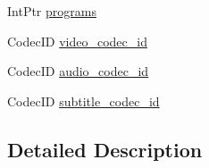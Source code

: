 \begin{DoxyCompactItemize}
IntPtr \hyperlink{struct_tao_1_1_f_fmpeg_1_1_f_fmpeg_1_1_a_v_format_context_a86326db4006cb8efcca4a42f7f04c2e2}{programs}
\item 
CodecID \hyperlink{struct_tao_1_1_f_fmpeg_1_1_f_fmpeg_1_1_a_v_format_context_a6eab37f64726db2dd3501676a4887a8b}{video\_\-codec\_\-id}
\item 
CodecID \hyperlink{struct_tao_1_1_f_fmpeg_1_1_f_fmpeg_1_1_a_v_format_context_a17defb4e5d6295e5a07a10b237a8687f}{audio\_\-codec\_\-id}
\item 
CodecID \hyperlink{struct_tao_1_1_f_fmpeg_1_1_f_fmpeg_1_1_a_v_format_context_a269f3ff5ff71f11ce8f430f381a40229}{subtitle\_\-codec\_\-id}
\end{DoxyCompactItemize}


\subsection{Detailed Description}



